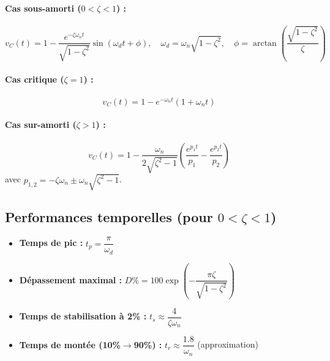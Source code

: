 \documentclass[12pt,a4paper]{article}
\begin{document}
	\paragraph{Cas sous-amorti ($0<\zeta<1$) :}
	\begin{equation}
	v_C(t) = 1 - \frac{e^{-\zeta\omega_n t}}{\sqrt{1-\zeta^2}} \sin(\omega_d t + \phi), \quad 
	\omega_d = \omega_n\sqrt{1-\zeta^2},\quad 
	\phi = \arctan\left(\frac{\sqrt{1-\zeta^2}}{\zeta}\right)
	\end{equation}
	
	\paragraph{Cas critique ($\zeta=1$) :}
	\begin{equation}
	v_C(t) = 1 - e^{-\omega_n t}(1 + \omega_n t)
	\end{equation}
	
	\paragraph{Cas sur-amorti ($\zeta>1$) :}
	\begin{equation}
	v_C(t) = 1 - \frac{\omega_n}{2\sqrt{\zeta^2-1}}\left(\frac{e^{p_1 t}}{p_1} - \frac{e^{p_2 t}}{p_2}\right)
	\end{equation}
	avec $p_{1,2} = -\zeta\omega_n \pm \omega_n\sqrt{\zeta^2-1}$.
	
	\subsection{Performances temporelles (pour $0<\zeta<1$)}
	\begin{itemize}
		\item \textbf{Temps de pic :} $t_p = \dfrac{\pi}{\omega_d}$
		\item \textbf{Dépassement maximal :} $D\% = 100\exp\left(-\dfrac{\pi\zeta}{\sqrt{1-\zeta^2}}\right)$
		\item \textbf{Temps de stabilisation à 2\% :} $t_s \approx \dfrac{4}{\zeta\omega_n}$
		\item \textbf{Temps de montée (10\%$\rightarrow$90\%) :} $t_r \approx \dfrac{1.8}{\omega_n}$ (approximation)
	\end{itemize}
	
\end{document}
